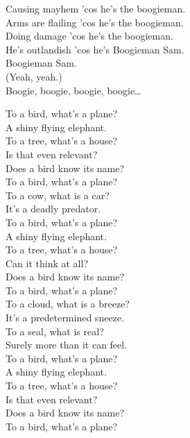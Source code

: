 Causing mayhem 'cos he's the boogieman. \\
Arms are flailing 'cos he's the boogieman. \\
Doing damage 'cos he's the boogieman. \\
He's outlandish 'cos he's Boogieman Sam. \\
Boogieman Sam. \\
(Yeah, yeah.) \\

Boogie, boogie, boogie, boogie… \\





To a bird, what's a plane? \\
A shiny flying elephant. \\
To a tree, what's a house? \\
Is that even relevant? \\
Does a bird know its name? \\
To a bird, what's a plane? \\

To a cow, what is a car? \\
It's a deadly predator. \\
To a bird, what's a plane? \\
A shiny flying elephant. \\
To a tree, what's a house? \\
Can it think at all? \\
Does a bird know its name? \\
To a bird, what's a plane? \\

To a cloud, what is a breeze? \\
It's a predetermined sneeze. \\
To a seal, what is real? \\
Surely more than it can feel. \\
To a bird, what's a plane? \\
A shiny flying elephant. \\
To a tree, what's a house? \\
Is that even relevant? \\
Does a bird know its name? \\
To a bird, what's a plane? \\

